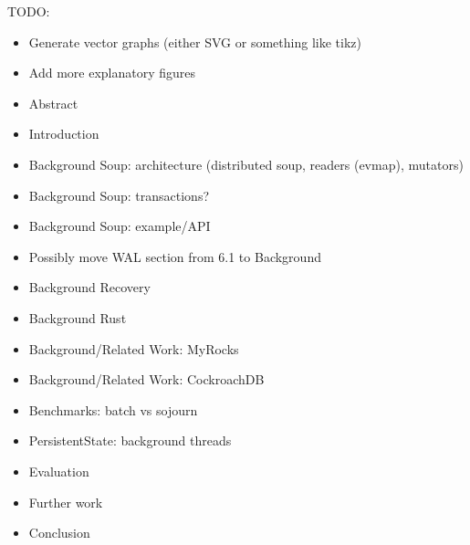 \color{purple}
TODO:
\begin{itemize}
  \item Generate vector graphs (either SVG or something like tikz)
  \item Add more explanatory figures

  \item Abstract
  \item Introduction

  \item Background Soup: architecture (distributed soup, readers (evmap), mutators)
  \item Background Soup: transactions?
  \item Background Soup: example/API
  \item Possibly move WAL section from 6.1 to Background

  \item Background Recovery
  \item Background Rust

  \item Background/Related Work: MyRocks
  \item Background/Related Work: CockroachDB

  \item Benchmarks: batch vs sojourn

  \item PersistentState: background threads

  \item Evaluation
  \item Further work
  \item Conclusion
\end{itemize}

